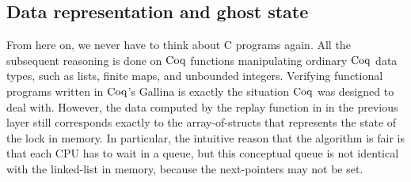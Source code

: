 \subsection{Data representation and ghost state}
\label{chapter:mcslock:sec:representation-ghost}

From here on, we never have to think about C programs again.  All the
subsequent reasoning is done on $\mathrm{Coq}$ functions manipulating ordinary
$\mathrm{Coq}$ data types, such as lists, finite maps, and unbounded integers.
Verifying functional programs written in $\mathrm{Coq}$'s Gallina is exactly the
situation $\mathrm{Coq}$ was designed to deal with. However, the data computed
by the replay function in in the previous layer still corresponds
exactly to the array-of-structs that represents the state of the lock
in memory.
In particular, the intuitive reason that the algorithm is fair is that
each CPU has to wait in a queue, but this conceptual queue is not identical with
the linked-list in memory, because the next-pointers may not be set.


